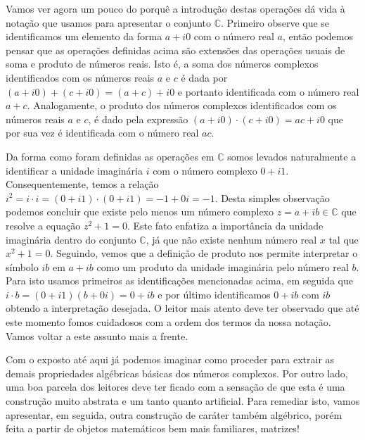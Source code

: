 Vamos ver agora um pouco do porquê a introdução destas operações dá vida 
à notação que usamos
para apresentar o conjunto $\mathbb{C}$. 
Primeiro observe que se identificamos um elemento da forma $a+i0$ 
com o número real $a$, então podemos pensar que as operações 
definidas acima são extensões das operações usuais de soma e produto de números reais. 
Isto é, a soma dos números complexos identificados com os números reais $a$ e $c$ é dada por 
$(a+i0)+(c+i0)=(a+c)+i0$ e portanto identificada com o número real $a+c$. Analogamente, 
o produto dos números complexos identificados com os números reais $a$ e $c$, é dado pela expressão
$(a+i0)\cdot(c+i0)=ac+i0$ que por sua vez é identificada com o número real $ac$. 

Da forma como foram definidas as operações em $\mathbb{C}$
somos levados naturalmente a identificar a unidade imaginária $i$ com o 
número complexo $0+i1$. Consequentemente, temos a relação
$i^2 = i\cdot i = (0+i1)\cdot(0+i1)= -1+0i = -1$. 
Desta simples observação podemos concluir que existe pelo menos 
um número complexo $z=a+ib\in \mathbb{C}$ 
que resolve a equação $z^2+1=0$. Este fato enfatiza a importância 
da unidade imaginária dentro do conjunto $\mathbb{C}$, já que não existe nenhum número 
real $x$ tal que $x^2+1=0$. Seguindo, vemos que a definição de produto nos permite interpretar 
o símbolo $ib$ em $a+ib$ como um produto da unidade imaginária pelo número real $b$. 
Para isto usamos primeiros as identificações mencionadas acima, em seguida que  
$i\cdot b = (0+i1)(b+0i)=0+ib$ e por último identificamos $0+ib$ com $ib$ obtendo 
a interpretação desejada. 
O leitor mais atento deve ter observado que até este momento fomos cuidadosos com a ordem dos termos da
nossa notação. Vamos voltar a este assunto mais a frente. 


Com o exposto até aqui já podemos imaginar como proceder para extrair
as demais propriedades algébricas básicas dos números complexos.
Por outro lado, uma boa parcela dos leitores deve ter ficado com a sensação de que esta é uma 
construção muito abstrata e um tanto quanto artificial. Para remediar isto, vamos
apresentar, em seguida, outra construção de caráter também algébrico, porém feita a partir de objetos matemáticos
bem mais familiares, matrizes! 

